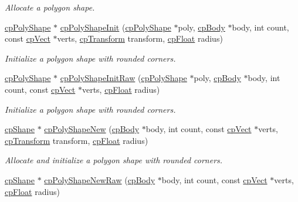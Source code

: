 \begin{DoxyCompactItemize}
\begin{DoxyCompactList}\small\item\em Allocate a polygon shape. \end{DoxyCompactList}\item 
\hyperlink{structcp_poly_shape}{cp\+Poly\+Shape} $\ast$ \hyperlink{group__cp_poly_shape_ga35b3f6fc2cc964f289babcabc3e0ed1a}{cp\+Poly\+Shape\+Init} (\hyperlink{structcp_poly_shape}{cp\+Poly\+Shape} $\ast$poly, \hyperlink{structcp_body}{cp\+Body} $\ast$body, int count, const \hyperlink{structcp_vect}{cp\+Vect} $\ast$verts, \hyperlink{structcp_transform}{cp\+Transform} transform, \hyperlink{group__basic_types_gac1ed65573e035bf892505768c852d8d3}{cp\+Float} radius)
\begin{DoxyCompactList}\small\item\em Initialize a polygon shape with rounded corners. \end{DoxyCompactList}\item 
\hyperlink{structcp_poly_shape}{cp\+Poly\+Shape} $\ast$ \hyperlink{group__cp_poly_shape_gaa770a491ea664ace5581c88cca80c310}{cp\+Poly\+Shape\+Init\+Raw} (\hyperlink{structcp_poly_shape}{cp\+Poly\+Shape} $\ast$poly, \hyperlink{structcp_body}{cp\+Body} $\ast$body, int count, const \hyperlink{structcp_vect}{cp\+Vect} $\ast$verts, \hyperlink{group__basic_types_gac1ed65573e035bf892505768c852d8d3}{cp\+Float} radius)
\begin{DoxyCompactList}\small\item\em Initialize a polygon shape with rounded corners. \end{DoxyCompactList}\item 
\hyperlink{structcp_shape}{cp\+Shape} $\ast$ \hyperlink{group__cp_poly_shape_ga1efdc8dbd304060b5e07bb732482aafa}{cp\+Poly\+Shape\+New} (\hyperlink{structcp_body}{cp\+Body} $\ast$body, int count, const \hyperlink{structcp_vect}{cp\+Vect} $\ast$verts, \hyperlink{structcp_transform}{cp\+Transform} transform, \hyperlink{group__basic_types_gac1ed65573e035bf892505768c852d8d3}{cp\+Float} radius)
\begin{DoxyCompactList}\small\item\em Allocate and initialize a polygon shape with rounded corners. \end{DoxyCompactList}\item 
\hyperlink{structcp_shape}{cp\+Shape} $\ast$ \hyperlink{group__cp_poly_shape_ga79088c28a4a292039ccd38014f6667ed}{cp\+Poly\+Shape\+New\+Raw} (\hyperlink{structcp_body}{cp\+Body} $\ast$body, int count, const \hyperlink{structcp_vect}{cp\+Vect} $\ast$verts, \hyperlink{group__basic_types_gac1ed65573e035bf892505768c852d8d3}{cp\+Float} radius)

\end{DoxyCompactItemize}
